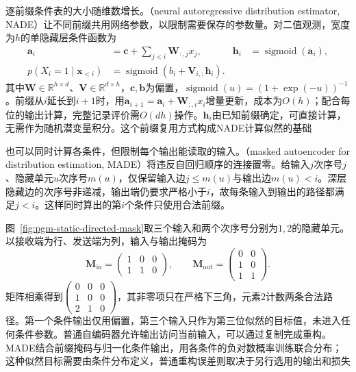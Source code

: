 逐前缀条件表的大小随维数增长。（neural autoregressive distribution estimator, NADE）让不同前缀共用网络参数，以限制需要保存的参数量。对二值观测，宽度为$h$的单隐藏层条件函数为
\begin{equation}
  \label{eq:pgm-static-directed-nade}
  \begin{aligned}
    \bm{a}_i&=\bm{c}+\sum_{j<i}\bm{W}_{:,j}x_j,&
    \bm{h}_i&=\operatorname{sigmoid}(\bm{a}_i),\\
    p(X_i=1\mid\bm{x}_{<i})
      &=\operatorname{sigmoid}
        (b_i+\bm{V}_{i,:}\bm{h}_i).
  \end{aligned}
\end{equation}
其中$\bm W\in\mathbb R^{h\times d}$、$\bm V\in\mathbb R^{d\times h}$，$\bm c,\bm b$为偏置，$\operatorname{sigmoid}(u)=(1+\exp(-u))^{-1}$。前缀从$i$延长到$i+1$时，用$\bm a_{i+1}=\bm a_i+\bm W_{:,i}x_i$增量更新，成本为$O(h)$；配合每位的输出计算，完整记录评价需$O(dh)$操作。$\bm h_i$由已知前缀确定，可直接计算，无需作为随机潜变量积分。这个前缀复用方式构成NADE计算似然的基础

也可以同时计算各条件，但限制每个输出能读取的输入。（masked autoencoder for distribution estimation, MADE）将违反自回归顺序的连接置零。给输入$j$次序号$j$、隐藏单元$u$次序号$m(u)$，仅保留输入边$j\le m(u)$与输出边$m(u)<i$。深层隐藏边的次序号非递减，输出端仍要求严格小于$i$，故每条输入到输出的路径都满足$j<i$。这样同时算出的第$i$个条件只使用合法前缀。

图~\ref{fig:pgm-static-directed-mask}取三个输入和两个次序号分别为$1,2$的隐藏单元。以接收端为行、发送端为列，输入与输出掩码为
\[
  \bm{M}_{\mathrm{in}}=
  \begin{pmatrix}1&0&0\\1&1&0\end{pmatrix},\qquad
  \bm{M}_{\mathrm{out}}=
  \begin{pmatrix}0&0\\1&0\\1&1\end{pmatrix}.
\]
矩阵相乘得到$\left(\begin{smallmatrix}0&0&0\\1&0&0\\2&1&0\end{smallmatrix}\right)$，其非零项只在严格下三角，元素$2$计数两条合法路径。第一个条件输出仅用偏置，第三个输入只作为第三位似然的目标值，未进入任何条件参数。普通自编码器允许输出访问当前输入，可以通过复制完成重构。MADE结合前缀掩码与归一化条件输出，用各条件的负对数概率训练联合分布；这种似然目标需要由条件分布定义，普通重构误差则取决于另行选用的输出和损失

